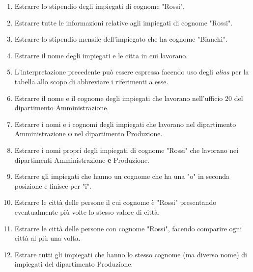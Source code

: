 \begin{enumerate}
	\item Estrarre lo stipendio degli impiegati di cognome "Rossi".
	

	\item Estrarre tutte le informazioni relative agli impiegati di cognome "Rossi".
	

	\item Estrarre lo stipendio mensile dell'impiegato che ha cognome "Bianchi".
	

	\item Estrarre il nome degli impiegati e le citta in cui lavorano.
	

	\item L'interpretazione precedente può essere espressa facendo uso degli \emph{alias} per la tabella allo scopo di abbreviare i riferimenti a esse.
	

	\item Estrarre il nome e il cognome degli impiegati che lavorano nell'ufficio 20 del dipartimento Amministrazione.
	

	\item Estrarre i nomi e i cognomi degli impiegati che lavorano nel dipartimento Amministrazione \textbf{o} nel dipartimento Produzione.
	

	\item Estrarre i nomi propri degli impiegati di cognome "Rossi" che lavorano nei dipartimenti Amministrazione \textbf{e} Produzione.
	

	\item Estrarre gli impiegati che hanno un cognome che ha una "o" in seconda posizione e finisce per "i".
	

	\item Estrarre le città delle persone il cui cognome è "Rossi" presentando eventualmente più volte lo stesso valore di città.
	

	\item Estrarre le città delle persone con cognome "Rossi", facendo comparire ogni città al più una volta.
	


\setcounter{enumi}{16}
	\item Estrare tutti gli impiegati che hanno lo stesso cognome (ma diverso nome) di impiegati del dipartimento Produzione.
	


\end{enumerate}
